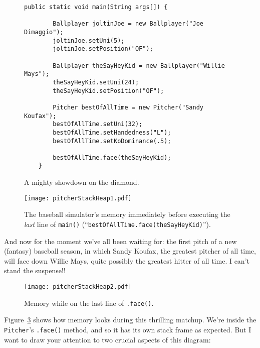 \begin{figure}[ht]
\begin{Verbatim}[fontsize=\small,samepage=true,frame=single]
    public static void main(String args[]) {

        Ballplayer joltinJoe = new Ballplayer("Joe Dimaggio");
        joltinJoe.setUni(5);
        joltinJoe.setPosition("OF");

        Ballplayer theSayHeyKid = new Ballplayer("Willie Mays");
        theSayHeyKid.setUni(24);
        theSayHeyKid.setPosition("OF");

        Pitcher bestOfAllTime = new Pitcher("Sandy Koufax");
        bestOfAllTime.setUni(32);
        bestOfAllTime.setHandedness("L");
        bestOfAllTime.setKoDominance(.5);

        bestOfAllTime.face(theSayHeyKid);
    }
\end{Verbatim}
\caption{A mighty showdown on the diamond.}
\label{fig:showdownCode}
\end{figure}

\begin{figure}[ht]
\centering
\texttt{[image: pitcherStackHeap1.pdf]}  %
\caption{The baseball simulator's memory immediately before executing the
\textit{last} line of \texttt{main()} (``\texttt{bestOfAllTime.face(theSayHeyKid)}'').}
\label{fig:pitcherStackHeap1}
\end{figure}


And now for the moment we've all been waiting for: the first pitch of a new
(fantasy) baseball season, in which Sandy Koufax, the greatest pitcher of all
time, will face down Willie Mays, quite possibly the greatest hitter of all
time. I can't stand the suspense!!

\begin{figure}[ht]
\centering
\texttt{[image: pitcherStackHeap2.pdf]}  %
\caption{Memory while on the last line of \texttt{.face()}.}
\label{fig:pitcherStackHeap2}
\end{figure}

Figure~\ref{fig:pitcherStackHeap2} shows how memory looks during this
thrilling matchup. We're inside the \texttt{Pitcher}'s \texttt{.face()}
method, and so it has its own stack frame as expected. But I want to draw your
attention to two crucial aspects of this diagram:

